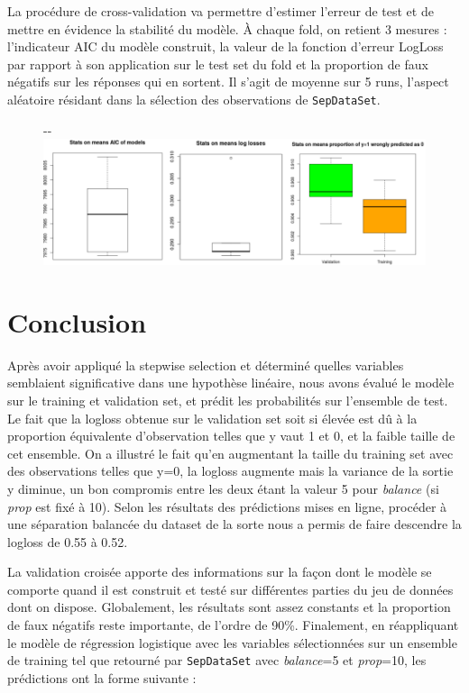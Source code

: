 \documentclass[]{article}
\begin{document}
\newpage

La procédure de cross-validation va permettre d'estimer l'erreur de test et de mettre en évidence la stabilité du modèle. À chaque fold, on retient 3 mesures : l'indicateur AIC du modèle construit, la valeur de la fonction d'erreur LogLoss par rapport à son application sur le test set du fold et la proportion de faux négatifs sur les réponses qui en sortent. Il s'agit de moyenne sur 5 runs, l'aspect aléatoire résidant dans la sélection des observations de \texttt{SepDataSet}.

\begin{figure}[!ht]
   \begin{adjustwidth}{-\oddsidemargin-1in}{-\rightmargin}
     \centering
     \includegraphics[width=\textwidth + 1cm]{cv}
   \end{adjustwidth}
\end{figure}

\section{Conclusion}

Après avoir appliqué la stepwise selection et déterminé quelles variables semblaient significative dans une hypothèse linéaire, nous avons évalué le modèle sur le training et validation set, et prédit les probabilités sur l'ensemble de test. Le fait que la logloss obtenue sur le validation set soit si élevée est dû à la proportion équivalente d'observation telles que y vaut 1 et 0, et la faible taille de cet ensemble. On a illustré le fait qu'en augmentant la taille du training set avec des observations telles que y=0, la logloss augmente mais la variance de la sortie y diminue, un bon compromis entre les deux étant la valeur 5 pour \textit{balance} (si \textit{prop} est fixé à 10). Selon les résultats des prédictions mises en ligne, procéder à une séparation balancée du dataset de la sorte nous a permis de faire descendre la logloss de 0.55 à 0.52.\\

\par La validation croisée apporte des informations sur la façon dont le modèle se comporte quand il est construit et testé sur différentes parties du jeu de données dont on dispose. Globalement, les résultats sont assez constants et la proportion de faux négatifs reste importante, de l'ordre de 90\%. Finalement, en réappliquant le modèle de régression logistique avec les variables sélectionnées sur un ensemble de training tel que retourné par \texttt{SepDataSet} avec \textit{balance}=5 et \textit{prop}=10, les prédictions ont la forme suivante :
\end{document}
